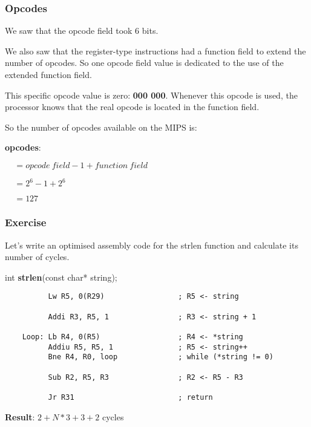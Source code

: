 
\begin{frame}
  \frametitle{Opcodes}

  We saw that the opcode field took 6 bits.

  \nl

  We also saw that the register-type instructions had a function field
  to extend the number of opcodes. So one opcode field value is
  dedicated to the use of the extended function field.

  \nl

  This specific opcode value is zero: \textbf{000 000}. Whenever this
  opcode is used, the processor knows that the real opcode is located
  in the function field.

  \nl

  So the number of opcodes available on the MIPS is:

  \nl

  \textbf{opcodes}:

  $~~~~~= opcode~field - 1 + function~field$

  $~~~~~= 2^{6} - 1 + 2^{6}$

  $~~~~~= 127$
\end{frame}

%
%

\begin{frame}[containsverbatim]
  \frametitle{Exercise}

  Let's write an optimised assembly code for the strlen function and
  calculate its number of cycles.

  \nl

  int \textbf{strlen}(const char* string);

  \begin{verbatim}
          Lw R5, 0(R29)                 ; R5 <- string

          Addi R3, R5, 1                ; R3 <- string + 1

    Loop: Lb R4, 0(R5)                  ; R4 <- *string
          Addiu R5, R5, 1               ; R5 <- string++
          Bne R4, R0, loop              ; while (*string != 0)

          Sub R2, R5, R3                ; R2 <- R5 - R3

          Jr R31                        ; return
  \end{verbatim}

  \textbf{Result}: $2 + N * 3 + 3 + 2$ cycles
\end{frame}


